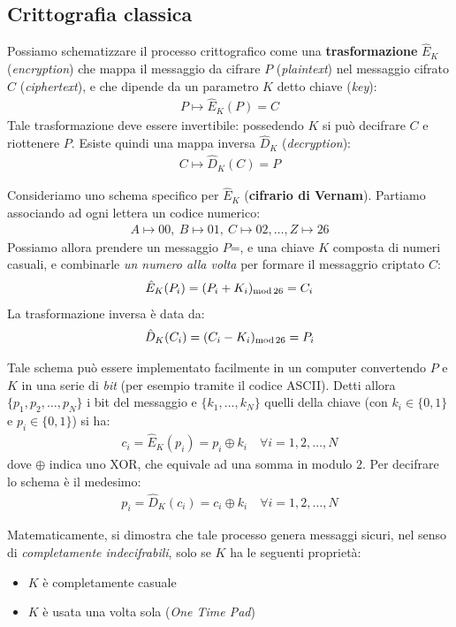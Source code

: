 \documentclass[../../InformazioneQuantistica.tex]{subfiles}
\begin{document}
\subsection{Crittografia classica}
Possiamo schematizzare il processo crittografico come una \textbf{trasformazione} $\hat{E}_K$ (\textit{encryption}) che mappa il messaggio da cifrare $P$ (\textit{plaintext}) nel messaggio cifrato $C$ (\textit{ciphertext}), e che dipende da un parametro $K$ detto chiave (\textit{key}):
\begin{align*}
P \mapsto \hat{E}_K(P) = C
\end{align*}
 Tale trasformazione deve essere invertibile: possedendo $K$ si può decifrare $C$ e riottenere $P$. Esiste quindi una mappa inversa $\hat{D}_K$ (\textit{decryption}):
\begin{align*}
C \mapsto \hat{D}_K(C) = P
\end{align*}

Consideriamo uno schema specifico per $\hat{E}_K$ (\textbf{cifrario di Vernam}). Partiamo associando ad ogni lettera un codice numerico:
\begin{align*}
A\mapsto 00, \> B \mapsto 01, \> C \mapsto 02, \dots , Z \mapsto 26
\end{align*}
Possiamo allora prendere un messaggio $P$=, e una chiave $K$ composta di numeri casuali, e combinarle \textit{un numero alla volta} per formare il messaggrio criptato $C$:
\begin{align*}
\hat{E}_K(P_i) = (P_i + K_i)_{\operatorname{mod}26} = C_i
\end{align*}
La trasformazione inversa è data da:
\begin{align*}
\hat{D}_K(C_i) = (C_i - K_i)_{\operatorname{mod}26} = P_i
\end{align*}

\begin{expl}
Tale schema può essere implementato facilmente in un computer convertendo $P$ e $K$ in una serie di \textit{bit} (per esempio tramite il codice ASCII). Detti allora $\{p_1, p_2, \dots, p_N\}$ i bit del messaggio e $\{k_1, \dots, k_N\}$ quelli della chiave (con $k_i \in \{0,1\}$ e $p_i \in \{0,1\}$) si ha:
\begin{align*}
c_i = \hat{E}_{K}(p_i) = p_i \oplus k_i \quad \forall i = 1, 2, \dots, N
\end{align*}
dove $\oplus$ indica uno XOR, che equivale ad una somma in modulo $2$. Per decifrare lo schema è il medesimo:
\begin{align*}
p_i = \hat{D}_K(c_i) = c_i \oplus k_i \quad \forall i =1, 2, \dots, N
\end{align*}
\end{expl}
Matematicamente, si dimostra che tale processo genera messaggi sicuri, nel senso di \textit{completamente indecifrabili}, solo se $K$ ha le seguenti proprietà:
\begin{itemize}
\item $K$ è completamente casuale
\item $K$ è usata una volta sola (\textit{One Time Pad})
\end{itemize}
\end{document}
